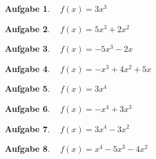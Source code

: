 \documentclass[12pt]{article}
\theoremstyle{note}
\newtheorem{aufgabe}{Aufgabe}
\begin{document}
\begin{flushleft}
\begin{aufgabe} ~  
$f(x)=$$3 x^{3}$
\end{aufgabe}\vspace{1em}\begin{aufgabe} ~  
$f(x)=$$5 x^{3} + 2 x^{2}$
\end{aufgabe}\vspace{1em}\begin{aufgabe} ~  
$f(x)=$$- 5 x^{3} - 2 x$
\end{aufgabe}\vspace{1em}\begin{aufgabe} ~  
$f(x)=$$- x^{3} + 4 x^{2} + 5 x$
\end{aufgabe}\vspace{1em}\begin{aufgabe} ~  
$f(x)=$$3 x^{4}$
\end{aufgabe}\vspace{1em}\begin{aufgabe} ~  
$f(x)=$$- x^{4} + 3 x^{3}$
\end{aufgabe}\vspace{1em}\begin{aufgabe} ~  
$f(x)=$$3 x^{4} - 3 x^{2}$
\end{aufgabe}\vspace{1em}\begin{aufgabe} ~  
$f(x)=$$x^{4} - 5 x^{3} - 4 x^{2}$
\end{aufgabe}\vspace{1em}
\end{flushleft} 
\end{document}
